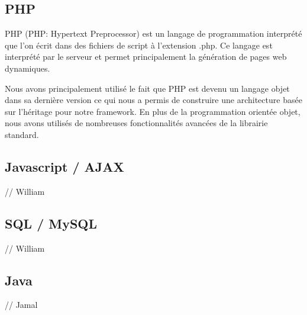         \subsection{PHP}

PHP (PHP: Hypertext Preprocessor) est un langage de programmation interprété que l'on écrit
dans des fichiers de script à l'extension .php. Ce langage est interprété par le serveur
et permet principalement la génération de pages web dynamiques.

Nous avons principalement utilisé le fait que PHP est devenu un langage objet dans sa dernière version
ce qui nous a permis de construire une architecture basée sur l'héritage pour notre framework.
En plus de la programmation orientée objet, nous avons utilisés de nombreuses fonctionnalités avancées
de la librairie standard.

        \subsection{Javascript / AJAX}

// William

        \subsection{SQL / MySQL}

// William

        \subsection{Java}

// Jamal
